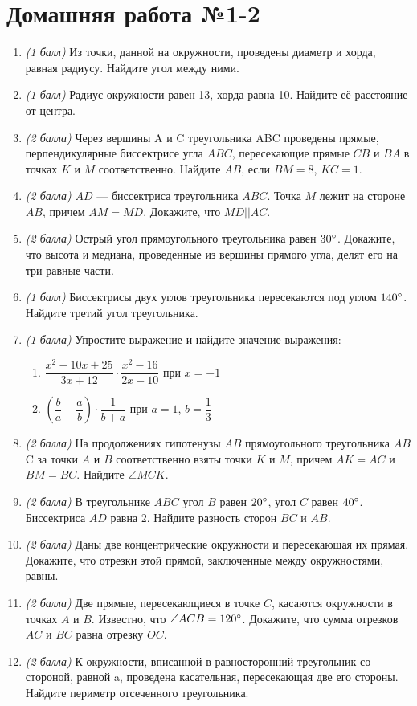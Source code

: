 \documentclass[12pt, a4paper]{article}
\begin{document}
		

\section*{Домашняя работа №1-2}
\begin{enumerate}
	\item \textit{(1 балл)} Из точки, данной на окружности, проведены диаметр и хорда, равная радиусу. Найдите угол между ними.
	\item \textit{(1 балл)} Радиус окружности равен 13, хорда равна 10. Найдите её расстояние от центра.
	\item \textit{(2 балла)} Через вершины A и C треугольника ABC проведены прямые, перпендикулярные биссектрисе угла $ABC$, пересекающие прямые $CB$ и $BA$ в точках $K$ и $M$ соответственно. Найдите $AB$, если $BM = 8$, $KC = 1$.
	\item \textit{(2 балла)} $AD$ — биссектриса треугольника $ABC$. Точка $M$ лежит на стороне $AB$, причем $AM = MD$. Докажите, что $MD||AC$.
	\item \textit{(2 балла)} Острый угол прямоугольного треугольника равен $30\degree$. Докажите, что высота и медиана, проведенные из вершины прямого угла, делят его на три равные части.
	\item \textit{(1 балл)} Биссектрисы двух углов треугольника пересекаются под углом $140\degree$. Найдите третий угол треугольника.
	\item \textit{(1 балла)} Упростите выражение и найдите значение выражения:
	\begin{multicols}{2}
		\begin{enumerate}[label=\asbuk*)]
			\item $\dfrac{x^2-10x+25}{3x+12}\cdot\dfrac{x^2-16}{2x-10}$ при $x=-1$
			\item $\left(\dfrac{b}{a}-\dfrac{a}{b}\right)\cdot\dfrac{1}{b+a}$ при $a=1$, $b=\dfrac{1}{3}$
		\end{enumerate}
	\end{multicols}
	\item \textit{(2 балла)} На продолжениях гипотенузы $AB$ прямоугольного треугольника $AB$C за точки $A$ и $B$ соответственно взяты точки $K$ и $M$, причем $AK = AC$ и $BM = BC$. Найдите $\angle MCK$.
	\item \textit{(2 балла)} В треугольнике $ABC$ угол $B$ равен $20\degree$, угол $C$ равен $40\degree$. Биссектриса $AD$ равна $2$. Найдите разность сторон $BC$ и $AB$.
	\item \textit{(2 балла)} Даны две концентрические окружности и пересекающая их прямая. Докажите, что отрезки этой прямой, заключенные между окружностями, равны.
	\item \textit{(2 балла)} Две прямые, пересекающиеся в точке $C$, касаются окружности в точках $A$ и $B$. Известно, что $\angle ACB = 120\degree$. Докажите, что сумма отрезков $AC$ и $BC$ равна отрезку $OC$.
	\item \textit{(2 балла)} К окружности, вписанной в равносторонний треугольник со стороной, равной a, проведена касательная, пересекающая две его стороны. Найдите периметр отсеченного треугольника.
	\end{enumerate}
\end{document}
